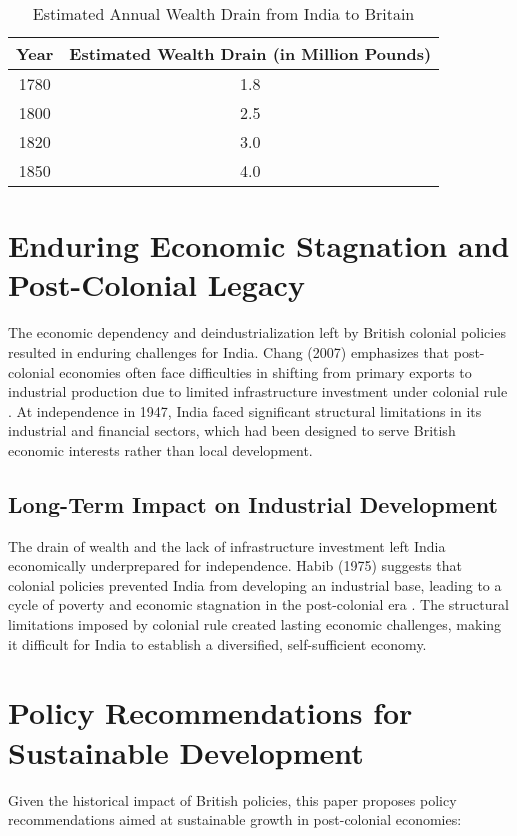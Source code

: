 \documentclass[9pt,twocolumn,twoside]{opticajnl}
\begin{document}
\begin{table}[h!]
\centering
\begin{tabular}{|c|c|}
\hline
\textbf{Year} & \textbf{Estimated Wealth Drain (in Million Pounds)} \\
\hline
1780 & 1.8 \\
1800 & 2.5 \\
1820 & 3.0 \\
1850 & 4.0 \\
\hline
\end{tabular}
\caption{Estimated Annual Wealth Drain from India to Britain}
\label{table:wealth_drain}
\end{table}

\section{Enduring Economic Stagnation and Post-Colonial Legacy}
The economic dependency and deindustrialization left by British colonial policies resulted in enduring challenges for India. Chang (2007) emphasizes that post-colonial economies often face difficulties in shifting from primary exports to industrial production due to limited infrastructure investment under colonial rule \cite{chang2007bad}. At independence in 1947, India faced significant structural limitations in its industrial and financial sectors, which had been designed to serve British economic interests rather than local development.

\subsection{Long-Term Impact on Industrial Development}
The drain of wealth and the lack of infrastructure investment left India economically underprepared for independence. Habib (1975) suggests that colonial policies prevented India from developing an industrial base, leading to a cycle of poverty and economic stagnation in the post-colonial era \cite{habib1975colonization}. The structural limitations imposed by colonial rule created lasting economic challenges, making it difficult for India to establish a diversified, self-sufficient economy.

\section{Policy Recommendations for Sustainable Development}
Given the historical impact of British policies, this paper proposes policy recommendations aimed at sustainable growth in post-colonial economies:
\end{document}
